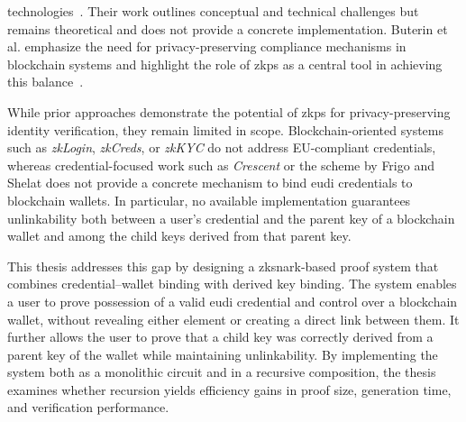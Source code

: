 technologies~\cite{Biedermann_2024}. Their work outlines conceptual and technical challenges but remains theoretical and does not provide a concrete implementation. Buterin et al. emphasize the need for privacy-preserving compliance mechanisms in blockchain systems and highlight the role of \acrshort{zkp}s as a central tool in achieving this balance~\cite{BUTERIN2024100176}.

While prior approaches demonstrate the potential of \acrshort{zkp}s for privacy-preserving identity verification, they remain limited in scope. Blockchain-oriented systems such as \textit{zkLogin}, \textit{zkCreds}, or \textit{zkKYC} do not address EU-compliant credentials, whereas credential-focused work such as \textit{Crescent} or the scheme by Frigo and Shelat does not provide a concrete mechanism to bind \acrshort{eudi} credentials to blockchain wallets. In particular, no available implementation guarantees unlinkability both between a user’s credential and the parent key of a blockchain wallet and among the child keys derived from that parent key.

This thesis addresses this gap by designing a \acrshort{zksnark}-based proof system that combines credential–wallet binding with derived key binding. The system enables a user to prove possession of a valid \acrshort{eudi} credential and control over a blockchain wallet, without revealing either element or creating a direct link between them. It further allows the user to prove that a child key was correctly derived from a parent key of the wallet while maintaining unlinkability. By implementing the system both as a monolithic circuit and in a recursive composition, the thesis examines whether recursion yields efficiency gains in proof size, generation time, and verification performance.
